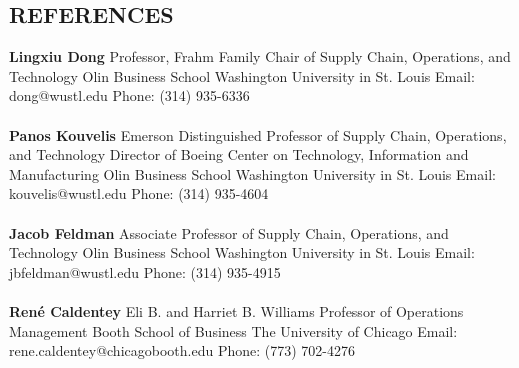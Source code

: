 \documentclass[margin]{res} %
\begin{document}
\begin{resume}
\section{REFERENCES}
    {\bf Lingxiu Dong} 
    \newline Professor, Frahm Family Chair of Supply Chain, Operations, and Technology 
    \newline Olin Business School
    \newline Washington University in St. Louis
    \newline Email: dong@wustl.edu
    \newline Phone: (314) 935-6336\\
    ~
    \\
    {\bf Panos Kouvelis} 
    \newline Emerson Distinguished Professor of
    Supply Chain, Operations, and Technology
    \newline Director of Boeing Center on
    Technology, Information and Manufacturing
    \newline Olin Business School
    \newline Washington University in St. Louis
    \newline Email: kouvelis@wustl.edu
    \newline Phone: (314) 935-4604\\
    ~
    \\
    {\bf Jacob Feldman} 
    \newline Associate Professor of Supply Chain, Operations, and Technology
    \newline Olin Business School
    \newline Washington University in St. Louis
    \newline Email: jbfeldman@wustl.edu
    \newline Phone: (314) 935-4915\\
    ~
    \\
    {\bf Ren\'{e} Caldentey} 
    \newline Eli B. and Harriet B. Williams Professor of Operations Management
    \newline Booth School of Business
    \newline The University of Chicago
    \newline Email: rene.caldentey@chicagobooth.edu
    \newline Phone: (773) 702-4276\\

\end{resume}
\end{document}
